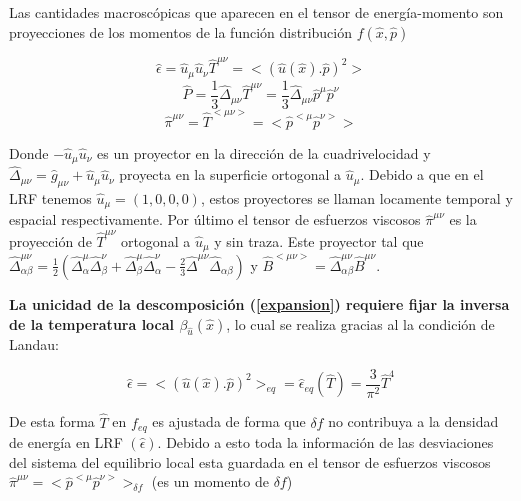 \documentclass[11pt,a4paper]{article}
\begin{document}
Las cantidades macroscópicas que aparecen en el tensor de energía-momento son proyecciones de los momentos de la función distribución $f( \hat{x}, \hat{p})$

\begin{equation}
\hat{\epsilon}=\hat{u}_{\mu}\hat{u}_{\nu}\hat{T}^{{\mu}{\nu}}=<(\hat{u}(\hat{x}).\hat{p})^2>
\end{equation}
\begin{equation}
\hat{P}=\frac{1}{3}\hat{\Delta}_{{\mu}{\nu}}\hat{T}^{{\mu}{\nu}}= \frac{1}{3}\hat{\Delta}_{{\mu}{\nu}}\hat{p}^{\mu}\hat{p}^{\nu}
\end{equation}
\begin{equation}
\hat{\pi}^{{\mu}{\nu}}= \hat{T}^{<{\mu}{\nu}>}=<\hat{p}^{<\mu}\hat{p}^{\nu>}>
\end{equation}

Donde $-\hat{u}_{\mu}\hat{u}_{\nu}$ es un proyector en la dirección de la cuadrivelocidad y $\hat{\Delta}_{{\mu}{\nu}}=\hat{g}_{{\mu}{\nu}}+\hat{u}_{\mu}\hat{u}_{\nu}$  proyecta en la superficie ortogonal a $\hat{u}_{\mu}$. Debido a que en el LRF tenemos $\hat{u}_{\mu}=(1,0,0,0)$, estos proyectores se llaman locamente temporal y espacial respectivamente.
Por último el tensor de esfuerzos viscosos $\hat{\pi}^{{\mu}{\nu}}$ es la proyección de $\hat{T}^{{\mu}{\nu}}$ ortogonal a $\hat{u}_{\mu}$ y sin traza. Este proyector tal que $\hat{\Delta}^{{\mu}{\nu}}_{{\alpha}{\beta}}=\frac{1}{2}(\hat{\Delta}^{\mu}_{\alpha}\hat{\Delta}^{\nu}_{\beta}+\hat{\Delta}^{\mu}_{\beta}\hat{\Delta}^{\nu}_{\alpha}-\frac{2}{3}\hat{\Delta}^{{\mu}{\nu}}\hat{\Delta}_{{\alpha}{\beta}})$ y $\hat{B}^{<{\mu}{\nu}>}=\hat{\Delta}^{{\mu}{\nu}}_{{\alpha}{\beta}}\hat{B}^{{\mu}{\nu}}$.

\textbf{La unicidad de la descomposición (\ref{expansion}) requiere fijar la inversa de la temperatura local $\beta_{\hat{u}}(\hat{x})$}, lo cual se realiza gracias al la condición de Landau:

\begin{equation}
\hat{\epsilon}=<(\hat{u}(\hat{x}).\hat{p})^2>_{eq}=\hat{\epsilon}_{eq}({\hat{T}})=\frac{3}{\pi^2}{\hat{T}}^4
\end{equation}

De esta forma ${\hat{T}}$ en $f_{eq}$ es ajustada de forma que ${\delta}f$ no contribuya  a la densidad de energía en LRF $(\hat{\epsilon})$. Debido a esto toda la información de las desviaciones del sistema del equilibrio local esta guardada en el tensor de esfuerzos viscosos $\hat{\pi}^{{\mu}{\nu}}=<\hat{p}^{<\mu}\hat{p}^{\nu>}>_{{\delta}f}$ (es un momento de ${{\delta}f}$)
\end{document}
